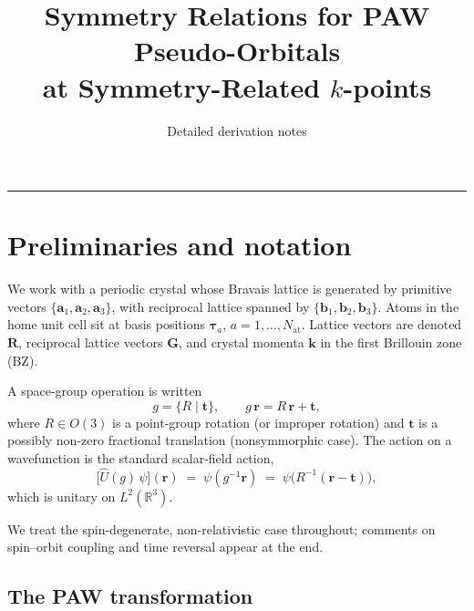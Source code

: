 \documentclass[11pt,a4paper]{article}
\title{Symmetry Relations for PAW Pseudo-Orbitals \\
       at Symmetry-Related $k$-points}
\author{Detailed derivation notes}
\date{}
\newcommand{\rr}{\mathbf{r}}
\newcommand{\kk}{\mathbf{k}}
\newcommand{\GG}{\mathbf{G}}
\newcommand{\RR}{\mathbf{R}}
\newcommand{\tautau}{\boldsymbol{\tau}}
\newcommand{\tvec}{\mathbf{t}}
\newcommand{\Uhat}{\hat{U}}
\begin{document}
\maketitle

\tableofcontents
\bigskip\hrule\bigskip

\section{Preliminaries and notation}

We work with a periodic crystal whose Bravais lattice is generated by primitive
vectors $\{\mathbf{a}_1,\mathbf{a}_2,\mathbf{a}_3\}$, with reciprocal lattice
spanned by $\{\mathbf{b}_1,\mathbf{b}_2,\mathbf{b}_3\}$. Atoms in the home unit
cell sit at basis positions $\tautau_a$, $a = 1,\dots,N_{\text{at}}$. Lattice
vectors are denoted $\RR$, reciprocal lattice vectors $\GG$, and crystal
momenta $\kk$ in the first Brillouin zone (BZ).

A space-group operation is written
\begin{equation}
g = \{R \mid \tvec\}, \qquad g\,\rr = R\,\rr + \tvec,
\end{equation}
where $R \in O(3)$ is a point-group rotation (or improper rotation) and $\tvec$
is a possibly non-zero fractional translation (nonsymmorphic case). The action
on a wavefunction is the standard scalar-field action,
\begin{equation}
\bigl[\Uhat(g)\,\psi\bigr](\rr) \;=\; \psi(g^{-1}\rr) \;=\; \psi\bigl(R^{-1}(\rr - \tvec)\bigr),
\end{equation}
which is unitary on $L^2(\mathbb{R}^3)$.

We treat the spin-degenerate, non-relativistic case throughout; comments on
spin--orbit coupling and time reversal appear at the end.

\subsection{The PAW transformation}
\end{document}
